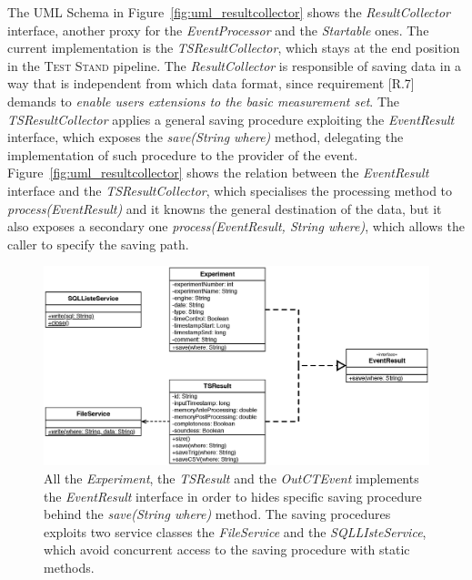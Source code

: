 The UML Schema in Figure~\ref{fig:uml_resultcollector} shows the \textit{ResultCollector} interface, another proxy for the \textit{EventProcessor} and the \textit{Startable} ones. The current implementation is the \textit{TSResultCollector}, which stays at the end position in the \textsc{Test Stand} pipeline. The \textit{ResultCollector} is responsible of saving data in a way that is independent from which data format, since requirement [R.7] demands to \textit{enable users extensions to the basic measurement set}. The \textit{TSResultCollector} applies a general saving procedure exploiting the \textit{EventResult} interface, which exposes the \textit{save(String where)} method, delegating the implementation of such procedure to the provider of the event. Figure~\ref{fig:uml_resultcollector} shows the relation between the \textit{EventResult} interface and the \textit{TSResultCollector}, which specialises the processing method to \textit{process(EventResult)} and it knowns the general destination of the data, but it also exposes a secondary one \textit{process(EventResult, String where)}, which allows the caller to specify the saving path.


\begin{figure}[tbh]
  \centering
	\includegraphics[width=\linewidth]{images/uml_resultcollector_events}
	\caption[\textsc{ResultCollector} Events - UML Schema]{ All the \textit{Experiment}, the \textit{TSResult} and the \textit{OutCTEvent} implements the \textit{EventResult} interface in order to hides specific saving procedure behind the \textit{save(String where)} method. The saving procedures exploits two service classes the \textit{FileService} and the \textit{SQLLIsteService}, which avoid concurrent access to the saving procedure with static methods.} 
  	\label{fig:uml_resultcollector_events}
\end{figure}

